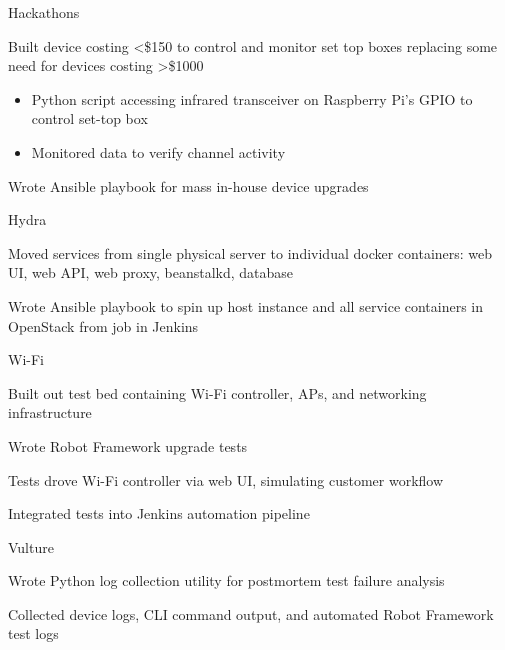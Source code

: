 
\begin{cventries}
  \cventry
    {} {Hackathons} {} {} {
      \begin{cvitems}
      \item {Built device costing <\$150 to control and monitor set top boxes replacing some need for devices costing >\$1000}
        \begin{itemize}
        \item {Python script accessing infrared transceiver on Raspberry Pi's GPIO to control set-top box}
        \item {Monitored data to verify channel activity}
        \end{itemize}
      \item {Wrote Ansible playbook for mass in-house device upgrades}
      \end{cvitems}
    }

  \cventry
    {} {Hydra} {} {} {
      \begin{cvitems} %
      \item {Moved services from single physical server to individual docker containers: web UI, web API, web proxy, beanstalkd, database}
      \item {Wrote Ansible playbook to spin up host instance and all service containers in OpenStack from job in Jenkins}
      \end{cvitems}
    }

  \cventry
    {} {Wi-Fi} {} {} {
      \begin{cvitems} %
      \item {Built out test bed containing Wi-Fi controller, APs, and networking infrastructure}
      \item {Wrote Robot Framework upgrade tests}
      \item {Tests drove Wi-Fi controller via web UI, simulating customer workflow}
      \item {Integrated tests into Jenkins automation pipeline}
      \end{cvitems}
    }

  \cventry
    {} {Vulture} {} {} {
      \begin{cvitems} %
      \item {Wrote Python log collection utility for postmortem test failure analysis}
      \item {Collected device logs, CLI command output, and automated Robot Framework test logs}
      \end{cvitems}
    }

\end{cventries}
